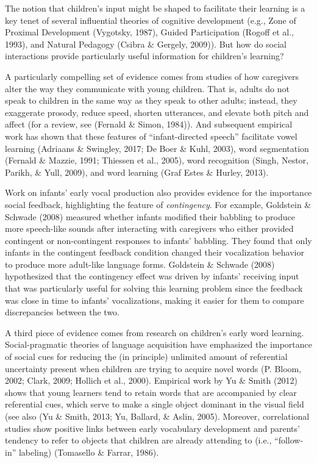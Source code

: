 \documentclass[a4paper,man,apacite,floatsintext]{apa6}
\begin{document}
The notion that children's input might be shaped to facilitate their
learning is a key tenet of several influential theories of cognitive
development (e.g., Zone of Proximal Development (Vygotsky, 1987), Guided
Participation (Rogoff et al., 1993), and Natural Pedagogy (Csibra \&
Gergely, 2009)). But how do social interactions provide particularly
useful information for children's learning?

A particularly compelling set of evidence comes from studies of how
caregivers alter the way they communicate with young children. That is,
adults do not speak to children in the same way as they speak to other
adults; instead, they exaggerate prosody, reduce speed, shorten
utterances, and elevate both pitch and affect (for a review, see
(Fernald \& Simon, 1984)). And subsequent empirical work has shown that
these features of ``infant-directed speech'' facilitate vowel learning
(Adriaans \& Swingley, 2017; De Boer \& Kuhl, 2003), word segmentation
(Fernald \& Mazzie, 1991; Thiessen et al., 2005), word recognition
(Singh, Nestor, Parikh, \& Yull, 2009), and word learning (Graf Estes \&
Hurley, 2013).

Work on infants' early vocal production also provides evidence for the
importance social feedback, highlighting the feature of
\emph{contingency}. For example, Goldstein \& Schwade (2008) measured
whether infants modified their babbling to produce more speech-like
sounds after interacting with caregivers who either provided contingent
or non-contingent responses to infants' babbling. They found that only
infants in the contingent feedback condition changed their vocalization
behavior to produce more adult-like language forms. Goldstein \& Schwade
(2008) hypothesized that the contingency effect was driven by infants'
receiving input that was particularly useful for solving this learning
problem since the feedback was close in time to infants' vocalizations,
making it easier for them to compare discrepancies between the two.

A third piece of evidence comes from research on children's early word
learning. Social-pragmatic theories of language acquisition have
emphasized the importance of social cues for reducing the (in principle)
unlimited amount of referential uncertainty present when children are
trying to acquire novel words (P. Bloom, 2002; Clark, 2009; Hollich et
al., 2000). Empirical work by Yu \& Smith (2012) shows that young
learners tend to retain words that are accompanied by clear referential
cues, which serve to make a single object dominant in the visual field
(see also (Yu \& Smith, 2013; Yu, Ballard, \& Aslin, 2005). Moreover,
correlational studies show positive links between early vocabulary
development and parents' tendency to refer to objects that children are
already attending to (i.e., ``follow-in'' labeling) (Tomasello \&
Farrar, 1986).
\end{document}
